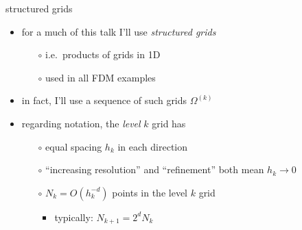 \documentclass[hide notes,intlimits,usenames,dvipsnames]{beamer}
\begin{document}
\begin{frame}{structured grids}
\begin{itemize}
\item for a much of this talk I'll use \emph{structured grids}
	\begin{itemize}
	\item[$\circ$] i.e.~products of grids in 1D
	\item[$\circ$] used in all FDM examples
	\end{itemize}
\item in fact, I'll use a sequence of such grids $\Omega^{(k)}$
\item regarding notation, the \emph{level} $k$ grid has
	\begin{itemize}
	\item[$\circ$] equal spacing $h_k$ in each direction
	\item[$\circ$] ``increasing resolution'' and ``refinement'' both mean $h_k \to 0$
    \item[$\circ$] $N_k = O(h_k^{-d})$ points in the level $k$ grid
	    \begin{itemize}
	    \item typically: $N_{k+1} = 2^d N_k$
	    \end{itemize}
	\end{itemize}

\bigskip

\end{itemize}
\end{frame}
\end{document}
